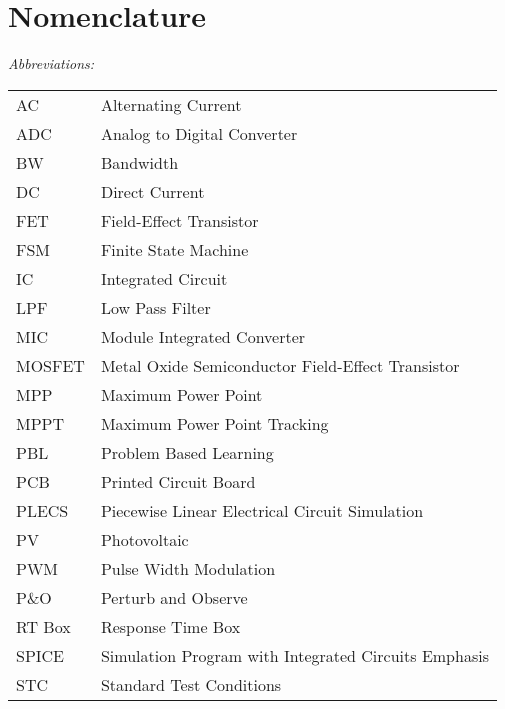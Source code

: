 \chapter*{Nomenclature}


 

\vspace{-10mm} %
\textit{Abbreviations:}\newline
\begin{tabular}{ll} %
AC & Alternating Current\\
ADC & Analog to Digital Converter \\
BW & Bandwidth \\
DC & Direct Current\\
FET & Field-Effect Transistor\\
FSM & Finite State Machine \\
IC & Integrated Circuit\\
LPF & Low Pass Filter\\
MIC & Module Integrated Converter\\
MOSFET & Metal Oxide Semiconductor Field-Effect Transistor\\
MPP & Maximum Power Point\\
MPPT & Maximum Power Point Tracking\\
PBL & Problem Based Learning\\
PCB & Printed Circuit Board\\
PLECS & Piecewise Linear Electrical Circuit Simulation\\
PV & Photovoltaic\\
PWM & Pulse Width Modulation\\
P\&O & Perturb and Observe\\
RT Box & Response Time Box \\
SPICE & Simulation Program with Integrated Circuits Emphasis \\
STC & Standard Test Conditions\\
\end{tabular}


